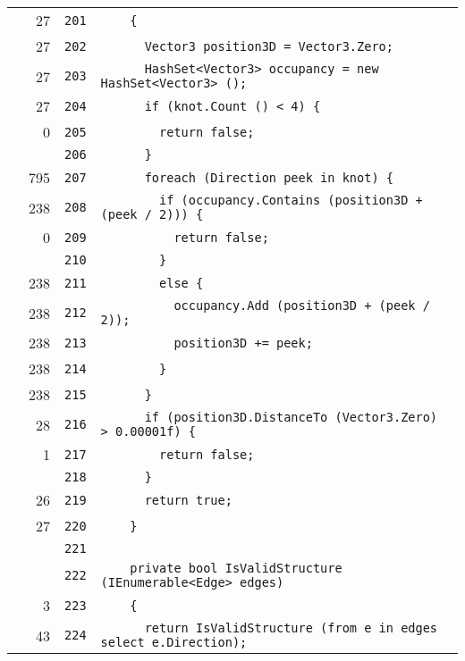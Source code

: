 \documentclass[a4paper,10pt]{article}
\begin{document}
\begin{longtable}[l]{lrrl}
\cellcolor{green} & 27 & \verb~201~ & \verb~    {~\\
\cellcolor{green} & 27 & \verb~202~ & \verb~      Vector3 position3D = Vector3.Zero;~\\
\cellcolor{green} & 27 & \verb~203~ & \verb~      HashSet<Vector3> occupancy = new HashSet<Vector3> ();~\\
\cellcolor{green} & 27 & \verb~204~ & \verb~      if (knot.Count () < 4) {~\\
\cellcolor{red} & 0 & \verb~205~ & \verb~        return false;~\\
\cellcolor{gray} &  & \verb~206~ & \verb~      }~\\
\cellcolor{green} & 795 & \verb~207~ & \verb~      foreach (Direction peek in knot) {~\\
\cellcolor{green} & 238 & \verb~208~ & \verb~        if (occupancy.Contains (position3D + (peek / 2))) {~\\
\cellcolor{red} & 0 & \verb~209~ & \verb~          return false;~\\
\cellcolor{gray} &  & \verb~210~ & \verb~        }~\\
\cellcolor{green} & 238 & \verb~211~ & \verb~        else {~\\
\cellcolor{green} & 238 & \verb~212~ & \verb~          occupancy.Add (position3D + (peek / 2));~\\
\cellcolor{green} & 238 & \verb~213~ & \verb~          position3D += peek;~\\
\cellcolor{green} & 238 & \verb~214~ & \verb~        }~\\
\cellcolor{green} & 238 & \verb~215~ & \verb~      }~\\
\cellcolor{green} & 28 & \verb~216~ & \verb~      if (position3D.DistanceTo (Vector3.Zero) > 0.00001f) {~\\
\cellcolor{green} & 1 & \verb~217~ & \verb~        return false;~\\
\cellcolor{gray} &  & \verb~218~ & \verb~      }~\\
\cellcolor{green} & 26 & \verb~219~ & \verb~      return true;~\\
\cellcolor{green} & 27 & \verb~220~ & \verb~    }~\\
\cellcolor{gray} &  & \verb~221~ & \verb~~\\
\cellcolor{gray} &  & \verb~222~ & \verb~    private bool IsValidStructure (IEnumerable<Edge> edges)~\\
\cellcolor{green} & 3 & \verb~223~ & \verb~    {~\\
\cellcolor{green} & 43 & \verb~224~ & \verb~      return IsValidStructure (from e in edges select e.Direction);~\\

\end{longtable}
\end{document}
